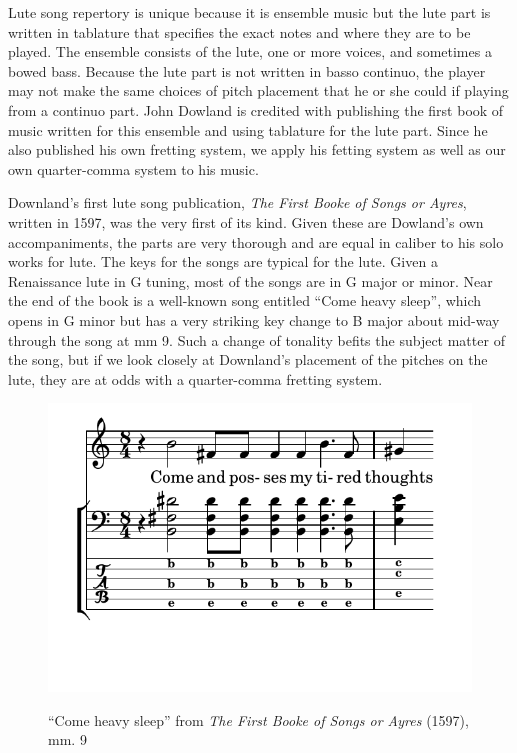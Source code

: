 Lute song repertory is unique because it is ensemble music but the lute part is written in
tablature that specifies the exact notes and where they are to be played. The ensemble
consists of the lute, one or more voices, and sometimes a bowed bass.  Because the lute
part is not written in basso continuo, the player may not make the same choices of pitch
placement that he or she could if playing from a continuo part.  John Dowland is credited
with publishing the first book of music written for this ensemble and using tablature for
the lute part.  Since he also published his own fretting system, we apply his fetting
system as well as our own quarter-comma system to his music.

Downland's first lute song publication, \textit{The First Booke of Songs or Ayres},
written in 1597, was the very first of its kind.  Given these are Dowland's own
accompaniments, the parts are very thorough and are equal in caliber to his solo works for
lute.  The keys for the songs are typical for the lute.  Given a Renaissance lute in G
tuning, most of the songs are in G major or minor.  Near the end of the book is a
well-known song entitled ``Come heavy sleep'', which opens in G minor but has a very
striking key change to B major about mid-way through the song at mm 9.  Such a change of
tonality befits the subject matter of the song, but if we look closely at Downland's
placement of the pitches on the lute, they are at odds with a quarter-comma fretting
system.
\begin{figure}[h]
\centering
\includegraphics{examples/come.pdf}
\label{dowland-come}
\caption{``Come heavy sleep'' from \textit{The First Booke of Songs or Ayres} (1597), mm. 9}
\end{figure}
